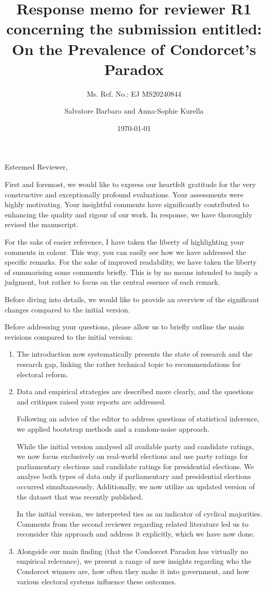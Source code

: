 \documentclass[a4paper, 12pt]{scrartcl}
\title{{\small Response memo for reviewer R1 concerning the submission entitled:} \\ On the Prevalence of Condorcet's Paradox }
\subtitle{Ms. Ref. No.: EJ MS20240844}
\author{Salvatore Barbaro and Anna-Sophie Kurella}
\date{\today}
\theoremstyle{break}
\begin{document}
\maketitle


\noindent Esteemed Reviewer,

First and foremost, we would like to express our heartfelt gratitude for the very constructive and exceptionally profound evaluations. Your assessments were highly motivating. Your insightful comments have significantly contributed to enhancing the quality and rigour of our work. In response, we have thoroughly revised the manuscript.

For the sake of easier reference, I have taken the liberty of highlighting your comments in colour. This way, you can easily see how we have addressed the specific remarks. For the sake of improved readability, we have taken the liberty of summarising some comments briefly. This is by no means intended to imply a judgment, but rather to focus on the central essence of each remark.

Before diving into details, we would like to provide an overview of the significant changes compared to the initial version.

Before addressing your questions, please allow us to briefly outline the main revisions compared to the initial version:
\begin{enumerate}
\item The introduction now systematically presents the state of research and the research gap, linking the rather technical topic to recommendations for electoral reform.
\item Data and empirical strategies are described more clearly, and the questions and critiques raised your reports are addressed.
	
Following an advice of the editor to address questions of statistical inference, we applied bootstrap methods and a random-noise approach.
	
While the initial version analysed all available party and candidate ratings, we now focus exclusively on real-world elections and use party ratings for parliamentary elections and candidate ratings for presidential elections. We analyse both types of data only if parliamentary and presidential elections occurred simultaneously. Additionally, we now utilize an updated version of the dataset that was recently published. 
	
In the initial version, we interpreted ties as an indicator of cyclical majorities. Comments from the second reviewer regarding related literature led us to reconsider this approach and address it explicitly, which we have now done.
%
\item Alongside our main finding (that the Condorcet Paradox has virtually no empirical relevance), we present a range of new insights regarding who the Condorcet winners are, how often they make it into government, and how various electoral systems influence these outcomes.
\end{enumerate}
\end{document}
